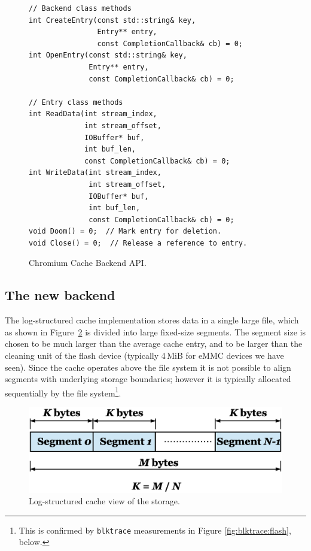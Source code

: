 \documentclass[letterpaper,twocolumn,10pt]{article}
\begin{document}
\begin{figure}[h]
{\small
\begin{verbatim}
// Backend class methods
int CreateEntry(const std::string& key,
                Entry** entry,
                const CompletionCallback& cb) = 0;
int OpenEntry(const std::string& key,
              Entry** entry,
              const CompletionCallback& cb) = 0;

// Entry class methods
int ReadData(int stream_index,
             int stream_offset,
             IOBuffer* buf,
             int buf_len,
             const CompletionCallback& cb) = 0;
int WriteData(int stream_index,
              int stream_offset,
              IOBuffer* buf,
              int buf_len,
              const CompletionCallback& cb) = 0;
void Doom() = 0;  // Mark entry for deletion.
void Close() = 0;  // Release a reference to entry.
\end{verbatim}
}
\caption{Chromium Cache Backend API.}
\label{cache-api}
\end{figure}

\subsection{The new backend}

The log-structured cache implementation stores data in a single large file,
which as shown in Figure~\ref{fig:storage} is divided into large
fixed-size segments.  The segment size is chosen to be much larger than the average cache
entry, and to be larger than the cleaning unit of the flash device (typically
4\,MiB for eMMC devices we have seen).  Since the cache operates above the file
system it is not possible to align segments with underlying storage boundaries;
however it is typically allocated sequentially by the file
system\footnote{This is confirmed by \texttt{blktrace} measurements in
  Figure \ref{fig:blktrace:flash}, below.}.

\begin{figure}[t]
  \begin{center}
    \includegraphics[width=0.9\columnwidth]{graphs/storage}
  \end{center}
  \caption{Log-structured cache view of the storage.}
  \label{fig:storage} 
\end{figure}
\end{document}
